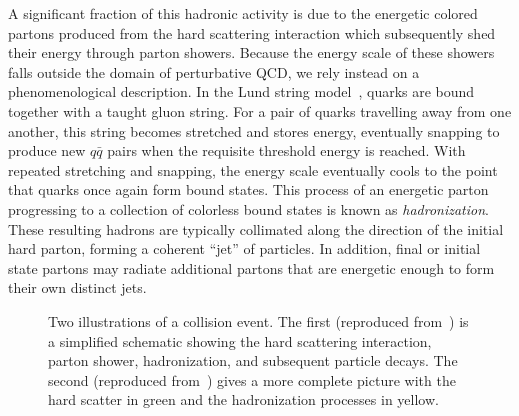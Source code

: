 A significant fraction of this hadronic activity is due to the energetic colored partons produced from the hard scattering interaction which subsequently shed their energy through parton showers.  Because the energy scale of these showers falls outside the domain of perturbative QCD, we rely instead on a phenomenological description.  In the Lund string model~\cite{Andersson198331}, quarks are bound together with a taught gluon string.  For a pair of quarks travelling away from one another, this string becomes stretched and stores energy, eventually snapping to produce new $q\bar{q}$ pairs when the requisite threshold energy is reached.  With repeated stretching and snapping, the energy scale eventually cools to the point that quarks once again form bound states.  This process of an energetic parton progressing to a collection of colorless bound states is known as \emph{hadronization}.  These resulting hadrons are typically collimated along the direction of the initial hard parton, forming a coherent ``jet'' of particles.  In addition, final or initial state partons may radiate additional partons that are energetic enough to form their own distinct jets.

\begin{figure}
  \centering
  \subbottom{
    
  }
  \caption[Two illustrations of a collision event]{Two illustrations of a collision event.  The first (reproduced from~\cite{Grogg:1376067}) is a simplified schematic showing the hard scattering interaction, parton shower, hadronization, and subsequent particle decays.  The second (reproduced from~\cite{Webber:2011}) gives a more complete picture with the hard scatter in green and the hadronization processes in yellow.}
  \label{diagram-showering}
\end{figure}


